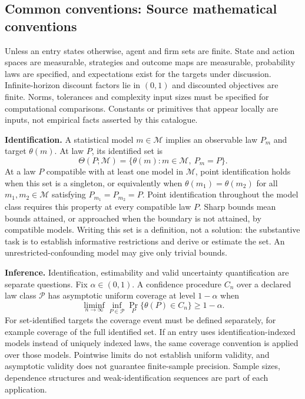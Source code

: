 \documentclass[11pt,a4paper]{article}
\begin{document}
\subsection*{Common conventions: Source mathematical conventions}

Unless an entry states otherwise, agent and firm sets are finite. State and action spaces are measurable, strategies and outcome maps are measurable, probability laws are specified, and expectations exist for the targets under discussion. Infinite-horizon discount factors lie in $(0,1)$ and discounted objectives are finite. Norms, tolerances and complexity input sizes must be specified for computational comparisons. Constants or primitives that appear locally are inputs, not empirical facts asserted by this catalogue.

\textbf{Identification.} A statistical model $m\in\mathcal M$ implies an observable law $P_m$ and target $\theta(m)$. At law $P$, its identified set is
\[
\Theta(P;\mathcal M)=\{\theta(m):m\in\mathcal M,\ P_m=P\}.
\]
At a law $P$ compatible with at least one model in $\mathcal M$, point identification holds when this set is a singleton, or equivalently when $\theta(m_1)=\theta(m_2)$ for all $m_1,m_2\in\mathcal M$ satisfying $P_{m_1}=P_{m_2}=P$. Point identification throughout the model class requires this property at every compatible law $P$. Sharp bounds mean bounds attained, or approached when the boundary is not attained, by compatible models. Writing this set is a definition, not a solution: the substantive task is to establish informative restrictions and derive or estimate the set. An unrestricted-confounding model may give only trivial bounds.

\textbf{Inference.} Identification, estimability and valid uncertainty quantification are separate questions. Fix $\alpha\in(0,1)$. A confidence procedure $C_n$ over a declared law class $\mathcal P$ has asymptotic uniform coverage at level $1-\alpha$ when
\[
\liminf_{n\to\infty}\inf_{P\in\mathcal P}\Pr_P\{\theta(P)\in C_n\}\geq1-\alpha.
\]
For set-identified targets the coverage event must be defined separately, for example coverage of the full identified set. If an entry uses identification-indexed models instead of uniquely indexed laws, the same coverage convention is applied over those models. Pointwise limits do not establish uniform validity, and asymptotic validity does not guarantee finite-sample precision. Sample sizes, dependence structures and weak-identification sequences are part of each application.
\end{document}
